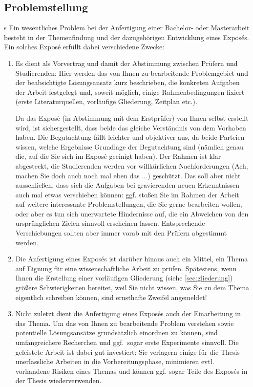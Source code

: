 \documentclass[11pt]{scrartcl}
\newcommand{\qto}[1]{\glqq #1\grqq}				%
\newcommand{\ggf}{ggf.\xspace}
\newcommand{\evtl}{evtl.\xspace}
\begin{document}
\subsection{Problemstellung}s
Ein wesentliches Problem bei der Anfertigung einer Bachelor- oder Masterarbeit besteht in der Themenfindung und der dazugehörigen Entwicklung eines Exposés. Ein solches Exposé erfüllt dabei verschiedene Zwecke:

\begin{enumerate}
\item Es dient als \qto{Vorvertrag} und damit der Abstimmung zwischen Prüfern und Studierenden: Hier werden das von Ihnen zu bearbeitende Problemgebiet und der beabsichtigte Lösungsansatz kurz beschrieben, die konkreten Aufgaben der Arbeit festgelegt und, soweit möglich, einige Rahmenbedingungen fixiert (erste Literaturquellen, vorläufige Gliederung, Zeitplan etc.).

Da das Exposé (in Abstimmung mit dem Erstprüfer) von Ihnen selbst erstellt wird, ist sichergestellt, dass beide das gleiche Verständnis von dem Vorhaben haben. Die Begutachtung fällt leichter und objektiver aus, da beide Parteien wissen, welche Ergebnisse Grundlage der Begutachtung sind (nämlich genau die, auf die Sie sich im Exposé geeinigt haben). Der Rahmen ist klar abgesteckt, die Studierenden werden vor willkürlichen Nachforderungen (\qto{Ach, machen Sie doch auch noch mal eben das ...}) geschützt. Das soll aber nicht ausschließen, dass sich die Aufgaben bei gravierenden neuen Erkenntnissen auch mal etwas verschieben können: \ggf stoßen Sie im Rahmen der Arbeit auf weitere interessante Problemstellungen, die Sie gerne bearbeiten wollen, oder aber es tun sich unerwartete Hindernisse auf, die ein Abweichen von den ursprünglichen Zielen sinnvoll erscheinen lassen. Entsprechende Verschiebungen sollten aber immer vorab mit den Prüfern abgestimmt werden.

\item Die Anfertigung eines Exposés ist darüber hinaus auch ein Mittel, ein Thema auf Eignung für eine wissenschaftliche Arbeit zu prüfen. Spätestens, wenn Ihnen die Erstellung einer vorläufigen Gliederung (siehe \cref{sec:gliederung}) größere Schwierigkeiten bereitet, weil Sie nicht wissen, was Sie zu dem Thema eigentlich schreiben können, sind ernsthafte Zweifel angemeldet!
\item Nicht zuletzt dient die Anfertigung eines Exposés auch der Einarbeitung in das Thema. Um das von Ihnen zu bearbeitende Problem verstehen sowie potentielle Lösungsansätze grundsätzlich einordnen zu können, sind umfangreichere Recherchen und \ggf\ sogar erste Experimente sinnvoll. Die geleistete Arbeit ist dabei gut investiert: Sie verlagern einige für die Thesis unerlässliche Arbeiten in die Vorbereitungsphase, minimieren \evtl vorhandene Risiken eines Themas und können \ggf sogar Teile des Exposés in der Thesis wiederverwenden.
\end{enumerate}
  
\end{document}
